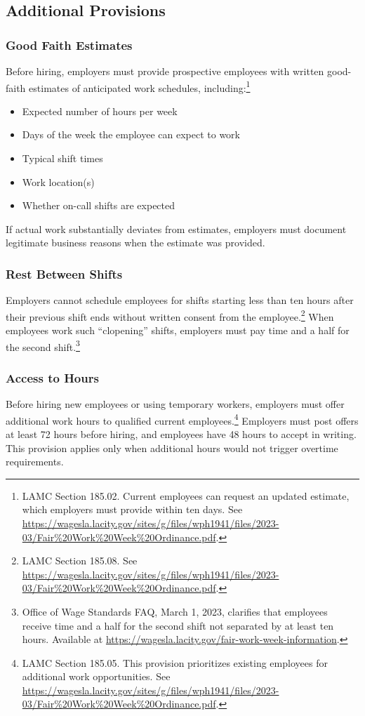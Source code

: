 \documentclass[letterpaper,11pt,leqno]{article}
\theoremstyle{paper}
\begin{document}
\subsection{Additional Provisions}

\subsubsection{Good Faith Estimates}
Before hiring, employers must provide prospective employees with written good-faith estimates of anticipated work schedules, including:\footnote{LAMC Section 185.02. Current employees can request an updated estimate, which employers must provide within ten days. See \url{https://wagesla.lacity.gov/sites/g/files/wph1941/files/2023-03/Fair\%20Work\%20Week\%20Ordinance.pdf}.}
\begin{itemize}
   \item Expected number of hours per week
   \item Days of the week the employee can expect to work
   \item Typical shift times
   \item Work location(s)
   \item Whether on-call shifts are expected
\end{itemize}

If actual work substantially deviates from estimates, employers must document legitimate business reasons when the estimate was provided.

\subsubsection{Rest Between Shifts}
Employers cannot schedule employees for shifts starting less than ten hours after their previous shift ends without written consent from the employee.\footnote{LAMC Section 185.08. See \url{https://wagesla.lacity.gov/sites/g/files/wph1941/files/2023-03/Fair\%20Work\%20Week\%20Ordinance.pdf}.} When employees work such ``clopening'' shifts, employers must pay time and a half for the second shift.\footnote{Office of Wage Standards FAQ, March 1, 2023, clarifies that employees receive time and a half for the second shift not separated by at least ten hours. Available at \url{https://wagesla.lacity.gov/fair-work-week-information}.}

\subsubsection{Access to Hours}
Before hiring new employees or using temporary workers, employers must offer additional work hours to qualified current employees.\footnote{LAMC Section 185.05. This provision prioritizes existing employees for additional work opportunities. See \url{https://wagesla.lacity.gov/sites/g/files/wph1941/files/2023-03/Fair\%20Work\%20Week\%20Ordinance.pdf}.} Employers must post offers at least 72 hours before hiring, and employees have 48 hours to accept in writing. This provision applies only when additional hours would not trigger overtime requirements.
\end{document}
